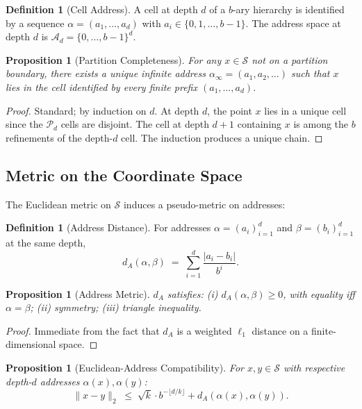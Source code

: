 \documentclass[11pt,twocolumn,a4paper]{article}
\newtheorem{proposition}[theorem]{Proposition}
\theoremstyle{definition}
\newtheorem{definition}[theorem]{Definition}
\theoremstyle{remark}
\newcommand{\Sc}{\mathcal{S}}
\begin{document}
\begin{definition}[Cell Address]
A cell at depth $d$ of a $b$-ary hierarchy is identified by a sequence $\alpha = (a_1, \ldots, a_d)$ with $a_i \in \{0, 1, \ldots, b-1\}$. The address space at depth $d$ is $\mathcal{A}_d = \{0,\ldots,b-1\}^d$.
\end{definition}

\begin{proposition}[Partition Completeness]
\label{prop:completeness}
For any $x \in \Sc$ not on a partition boundary, there exists a unique infinite address $\alpha_\infty = (a_1, a_2, \ldots)$ such that $x$ lies in the cell identified by every finite prefix $(a_1, \ldots, a_d)$.
\end{proposition}

\begin{proof}
Standard; by induction on $d$. At depth $d$, the point $x$ lies in a unique cell since the $\mathcal{P}_d$ cells are disjoint. The cell at depth $d+1$ containing $x$ is among the $b$ refinements of the depth-$d$ cell. The induction produces a unique chain.
\end{proof}

\subsection{Metric on the Coordinate Space}

The Euclidean metric on $\Sc$ induces a pseudo-metric on addresses:

\begin{definition}[Address Distance]
\label{def:address-dist}
For addresses $\alpha = (a_i)_{i=1}^d$ and $\beta = (b_i)_{i=1}^d$ at the same depth,
\[
d_A(\alpha, \beta) \;=\; \sum_{i=1}^{d} \frac{|a_i - b_i|}{b^i}.
\]
\end{definition}

\begin{proposition}[Address Metric]
\label{prop:metric}
$d_A$ satisfies: (i) $d_A(\alpha, \beta) \geq 0$, with equality iff $\alpha = \beta$; (ii) symmetry; (iii) triangle inequality.
\end{proposition}

\begin{proof}
Immediate from the fact that $d_A$ is a weighted $\ell_1$ distance on a finite-dimensional space.
\end{proof}

\begin{proposition}[Euclidean-Address Compatibility]
\label{prop:compat}
For $x, y \in \Sc$ with respective depth-$d$ addresses $\alpha(x), \alpha(y)$:
\[
\|x - y\|_2 \;\leq\; \sqrt{k} \cdot b^{-\lfloor d/k \rfloor} + d_A(\alpha(x), \alpha(y)).
\]
\end{proposition}
\end{document}
